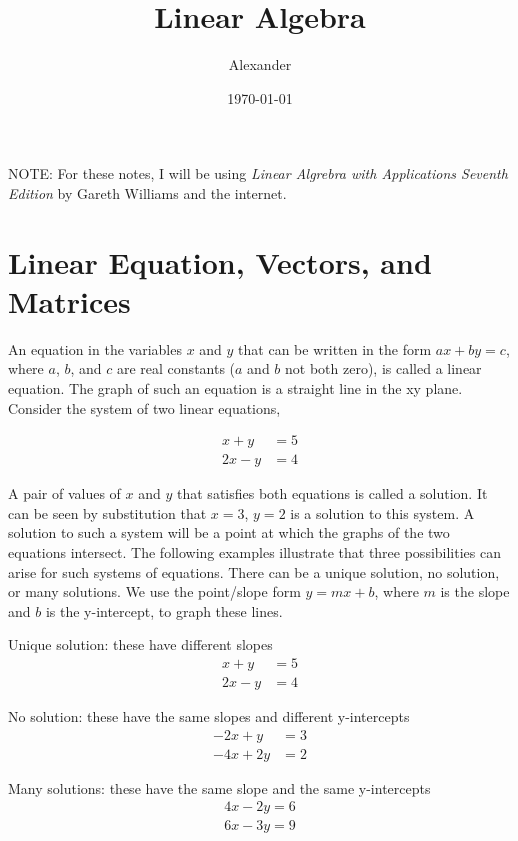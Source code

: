 \documentclass{article}
\title{Linear Algebra}
\author{Alexander}
\date{\today}
\begin{document}
\maketitle

NOTE: For these notes, I will be using \textit{Linear Algrebra with Applications Seventh Edition} by Gareth Williams and the internet.

\section{Linear Equation, Vectors, and Matrices}

An equation in the variables $x$ and $y$ that can be written in the form $ax + by = c$, where $a$, $b$, and $c$ are real constants ($a$ and $b$ not both zero), is called a linear equation. The graph of such an equation is a straight line in the xy plane. Consider the system of two linear equations,
\begin{center}
\begin{align*}
x + y & = 5\\
2x - y &= 4
\end{align*}
\end{center}
A pair of values of $x$ and $y$ that satisfies both equations is called a solution. It can be seen by substitution that $x = 3$, $y = 2$ is a solution to this system. A solution to such a system will be a point at which the graphs of the two equations intersect. The following examples illustrate that three possibilities can arise for such systems of equations. There can be a unique solution, no solution, or many solutions. We use the point/slope form $y = mx + b$, where $m$ is the slope and $b$ is the y-intercept, to graph these lines.

Unique solution: these have different slopes
\begin{align*}
x + y &= 5 \\
2x - y &= 4
\end{align*}

No solution: these have the same slopes and different y-intercepts
\begin{align*}
-2x + y &= 3\\
-4x + 2y &= 2
\end{align*}

Many solutions: these have the same slope and the same y-intercepts
\begin{align*}
4x - 2y = 6\\
6x -3y = 9
\end{align*}
\end{document}
